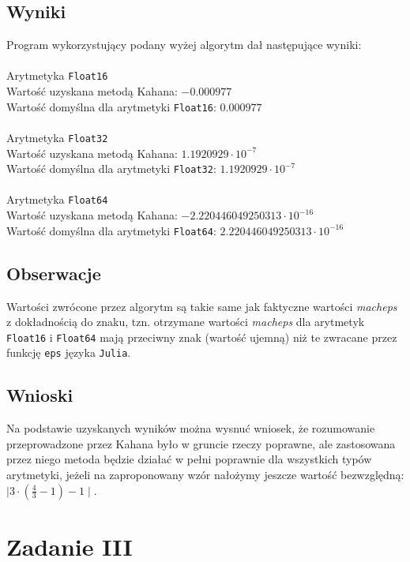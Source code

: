 \documentclass{article}
\begin{document}
\subsection{Wyniki}
Program wykorzystujący podany wyżej algorytm dał następujące wyniki:\\\\
Arytmetyka \texttt{Float16} \\
Wartość uzyskana metodą Kahana: $-0.000977$ \\
Wartość domyślna dla arytmetyki \texttt{Float16}: $0.000977$ \\\\
Arytmetyka \texttt{Float32} \\
Wartość uzyskana metodą Kahana: $1.1920929 \cdot 10^{-7}$ \\
Wartość domyślna dla arytmetyki \texttt{Float32}: $1.1920929 \cdot 10^{-7}$ \\\\
Arytmetyka \texttt{Float64} \\
Wartość uzyskana metodą Kahana: $-2.220446049250313 \cdot 10^{-16}$ \\
Wartość domyślna dla arytmetyki \texttt{Float64}: $2.220446049250313 \cdot 10^{-16}$ \\

\subsection{Obserwacje}
Wartości zwrócone przez algorytm są takie same jak faktyczne wartości \textit{macheps} z dokładnością do znaku, tzn. otrzymane wartości \textit{macheps} dla arytmetyk \texttt{Float16} i \texttt{Float64} mają przeciwny znak (wartość ujemną) niż te zwracane przez funkcję \texttt{eps} języka \texttt{Julia}.

\subsection{Wnioski}
Na podstawie uzyskanych wyników można wysnuć wniosek, że rozumowanie przeprowadzone przez Kahana było w gruncie rzeczy poprawne, ale zastosowana przez niego metoda będzie działać w pełni poprawnie dla wszystkich typów arytmetyki, jeżeli na zaproponowany wzór nałożymy jeszcze wartość bezwzględną: $\mid 3 \cdot (\frac{4}{3} - 1) - 1 \mid$. 

\section{Zadanie III}
\end{document}
